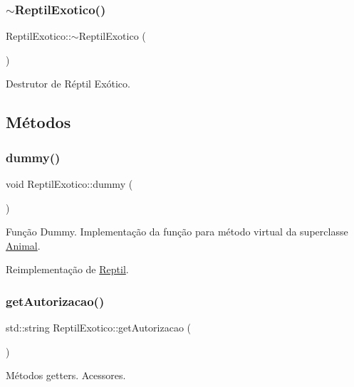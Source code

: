 \subsubsection{\texorpdfstring{$\sim$\+Reptil\+Exotico()}{~ReptilExotico()}}
{\footnotesize\ttfamily Reptil\+Exotico\+::$\sim$\+Reptil\+Exotico (\begin{DoxyParamCaption}{ }\end{DoxyParamCaption})}

Destrutor de Réptil Exótico. 

\subsection{Métodos}
\mbox{\label{classReptilExotico_aa59602e743a05deba4f1ff2fa453607a}} 
\subsubsection{\texorpdfstring{dummy()}{dummy()}}
{\footnotesize\ttfamily void Reptil\+Exotico\+::dummy (\begin{DoxyParamCaption}{ }\end{DoxyParamCaption})\hspace{0.3cm}{\ttfamily [virtual]}}

Função Dummy. Implementação da função para método virtual da superclasse \hyperlink{classAnimal}{Animal}. 

Reimplementação de \hyperlink{classReptil_acfbb0461fc05ec7b08332dd4cee122c6}{Reptil}.

\mbox{\label{classReptilExotico_a0929d82c7a740fbc0f39902b6ec25167}} 
\subsubsection{\texorpdfstring{get\+Autorizacao()}{getAutorizacao()}}
{\footnotesize\ttfamily std\+::string Reptil\+Exotico\+::get\+Autorizacao (\begin{DoxyParamCaption}{ }\end{DoxyParamCaption})}

Métodos getters. Acessores. \mbox{\label{classReptilExotico_a364d9e440d0c1f6ae8c03bdb51289502}} 
